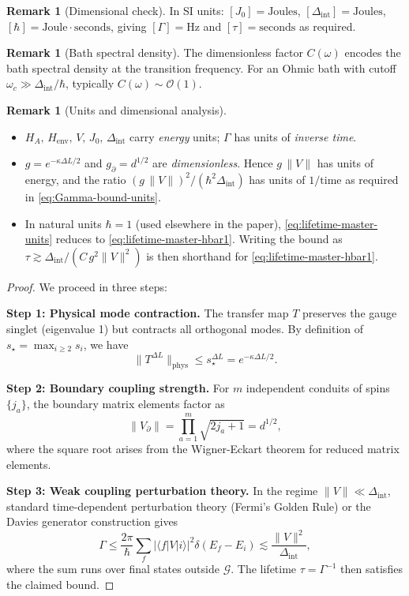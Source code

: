 \documentclass[11pt]{article}
\theoremstyle{plain}
\theoremstyle{definition}
\newtheorem{remark}[theorem]{Remark}
\begin{document}
\begin{remark}[Dimensional check]
  In SI units: $[J_0] = \text{Joules}$, $[\Delta_{\mathrm{int}}] = \text{Joules}$,
  $[\hbar] = \text{Joule}\cdot\text{seconds}$, giving $[\Gamma] = \text{Hz}$
  and $[\tau] = \text{seconds}$ as required.
\end{remark}

\begin{remark}[Bath spectral density]
  The dimensionless factor $C(\omega)$ encodes the bath spectral density at the
  transition frequency. For an Ohmic bath with cutoff $\omega_c \gg \Delta_{\mathrm{int}}/\hbar$,
  typically $C(\omega) \sim \mathcal{O}(1)$.
\end{remark}

\begin{remark}[Units and dimensional analysis]
  \leavevmode
  \begin{itemize}[leftmargin=1.5em]
    \item $H_A,\,H_{\mathrm{env}},\,V,\,J_0,\,\Delta_{\mathrm{int}}$ carry \emph{energy} units; $\Gamma$ has units of \emph{inverse time}.
    \item $g=e^{-\kappa \Delta L/2}$ and $g_{\partial}=d^{1/2}$ are \emph{dimensionless}. Hence $g\,\|V\|$ has units of energy, and the ratio $(g\,\|V\|)^2/(\hbar^2\Delta_{\mathrm{int}})$ has units of $1/\text{time}$ as required in \eqref{eq:Gamma-bound-units}.
    \item In natural units $\hbar=1$ (used elsewhere in the paper), \eqref{eq:lifetime-master-units} reduces to \eqref{eq:lifetime-master-hbar1}. Writing the bound as $\tau \gtrsim \Delta_{\mathrm{int}}/(C\,g^2\|V\|^2)$ is then shorthand for \eqref{eq:lifetime-master-hbar1}.
  \end{itemize}
\end{remark}

\begin{proof}
  We proceed in three steps:

  \textbf{Step 1: Physical mode contraction.}
  The transfer map $T$ preserves the gauge singlet (eigenvalue 1) but contracts all orthogonal modes. By definition of $s_\star = \max_{i \geq 2} s_i$, we have
  \[
    \|T^{\Delta L}\|_{\mathrm{phys}} \leq s_\star^{\Delta L} = e^{-\kappa \Delta L/2}.
  \]

  \textbf{Step 2: Boundary coupling strength.}
  For $m$ independent conduits of spins $\{j_a\}$, the boundary matrix elements factor as
  \[
    \|V_\partial\| = \prod_{a=1}^m \sqrt{2j_a+1} = d^{1/2},
  \]
  where the square root arises from the Wigner-Eckart theorem for reduced matrix elements.

  \textbf{Step 3: Weak coupling perturbation theory.}
  In the regime $\|V\| \ll \Delta_{\mathrm{int}}$, standard time-dependent perturbation theory (Fermi's Golden Rule) or the Davies generator construction gives
  \[
    \Gamma \leq \frac{2\pi}{\hbar} \sum_f |\langle f|V|i\rangle|^2 \delta(E_f - E_i) \lesssim \frac{\|V\|^2}{\Delta_{\mathrm{int}}},
  \]
  where the sum runs over final states outside $\mathcal{G}$. The lifetime $\tau = \Gamma^{-1}$ then satisfies the claimed bound.
\end{proof}
\end{document}
